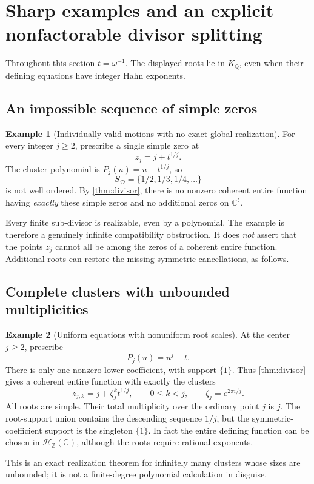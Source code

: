 \documentclass[11pt,letterpaper]{article}
\theoremstyle{definition}
\newtheorem{example}[example]{Example}
\theoremstyle{remark}
\newcommand{\C}{\mathbb C}
\newcommand{\Z}{\mathbb Z}
\newcommand{\Q}{\mathbb Q}
\newcommand{\sh}{^{\sharp}}
\numberwithin{equation}{section}
\begin{document}
\section{Sharp examples and an explicit nonfactorable divisor splitting}\label{sec:examples}
Throughout this section $t=\omega^{-1}$. The displayed roots lie in $K_\Q$, even when their defining equations have integer Hahn exponents.

\subsection{An impossible sequence of simple zeros}
\begin{example}[Individually valid motions with no exact global realization]\label{ex:simple}
For every integer $j\ge2$, prescribe a single simple zero at
\[
 z_j=j+t^{1/j}.
\]
The cluster polynomial is $P_j(u)=u-t^{1/j}$, so
\[
 S_{\mathcal D}=\{1/2,1/3,1/4,\ldots\}
\]
is not well ordered. By \cref{thm:divisor}, there is no nonzero coherent entire function having \emph{exactly} these simple zeros and no additional zeros on $\C\sh$.
\end{example}
Every finite sub-divisor is realizable, even by a polynomial. The example is therefore a genuinely infinite compatibility obstruction. It does \emph{not} assert that the points $z_j$ cannot all be among the zeros of a coherent entire function. Additional roots can restore the missing symmetric cancellations, as follows.

\subsection{Complete clusters with unbounded multiplicities}
\begin{example}[Uniform equations with nonuniform root scales]\label{ex:fullclusters}
At the center $j\ge2$, prescribe
\begin{equation}\label{eq:unboundedclusters}
 P_j(u)=u^j-t.
\end{equation}
There is only one nonzero lower coefficient, with support $\{1\}$. Thus \cref{thm:divisor} gives a coherent entire function with exactly the clusters
\[
 z_{j,k}=j+\zeta_j^k t^{1/j},\qquad 0\le k<j,
 \qquad \zeta_j=e^{2\pi i/j}.
\]
All roots are simple. Their total multiplicity over the ordinary point $j$ is $j$. The root-support union contains the descending sequence $1/j$, but the symmetric-coefficient support is the singleton $\{1\}$. In fact the entire defining function can be chosen in $\mathscr H_{\Z}(\C)$, although the roots require rational exponents.
\end{example}
This is an exact realization theorem for infinitely many clusters whose sizes are unbounded; it is not a finite-degree polynomial calculation in disguise.
\end{document}
